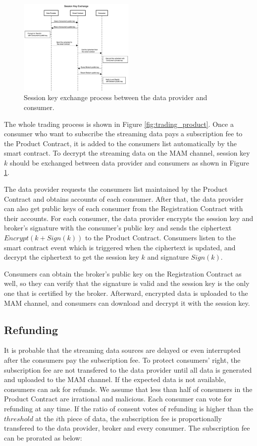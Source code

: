 \documentclass[journal,a4paper]{IEEEtran}
\begin{document}
\begin{figure}[h]
	\centering
	\includegraphics[width=0.5\textwidth]{key_exchange}
	\caption{Session key exchange process between the data provider and consumer.}
	\label{fig:key_exchange}
\end{figure}

The whole trading process is shown in Figure \ref{fig:trading_product}. Once a consumer who want to subscribe the streaming data pays a subscription fee to the Product Contract, it is added to the consumers list automatically by the smart contract. To decrypt the streaming data on the MAM channel, session key $k$ should be exchanged between data provider and consumers as shown in Figure \ref{fig:key_exchange}.

The data provider requests the consumers list maintained by the Product Contract and obtains accounts of each consumer. After that, the data provider can also get public keys of each consumer from the Registration Contract with their accounts. For each consumer, the data provider encrypts the session key and broker's signature with the consumer's public key and sends the ciphertext $Encrypt(k + Sign(k))$ to the Product Contract. Consumers listen to the smart contract event which is triggered when the ciphertext is updated, and decrypt the ciphertext to get the session key $k$ and signature $Sign(k)$. 

Consumers can obtain the broker's public key on the Registration Contract as well, so they can verify that the signature is valid and the session key is the only one that is certified by the broker. Afterward, encrypted data is uploaded to the MAM channel, and consumers can download and decrypt it with the session key.

\subsection{Refunding}
It is probable that the streaming data sources are delayed or even interrupted after the consumers pay the subscription fee. To protect consumers' right, the subscription fee are not transfered to the data provider until all data is generated and uploaded to the MAM channel. If the expected data is not available, consumers can ask for refunds. We assume that less than half of consumers in the Product Contract are irrational and malicious. Each consumer can vote for refunding at any time. If the ratio of consent votes of refunding is higher than the $threshold$ at the $i$th piece of data, the subscription fee is proportionally transfered to the data provider, broker and every consumer. The subscription fee can be prorated as below:
\end{document}

